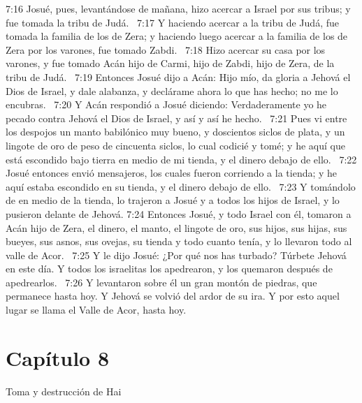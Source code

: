 7:16 Josué, pues, levantándose de mañana, hizo acercar a Israel por sus tribus; y fue tomada la tribu de Judá.  
7:17 Y haciendo acercar a la tribu de Judá, fue tomada la familia de los de Zera; y haciendo luego acercar a la familia de los de Zera por los varones, fue tomado Zabdi.  
7:18 Hizo acercar su casa por los varones, y fue tomado Acán hijo de Carmi, hijo de Zabdi, hijo de Zera, de la tribu de Judá.  
7:19 Entonces Josué dijo a Acán: Hijo mío, da gloria a Jehová el Dios de Israel, y dale alabanza, y declárame ahora lo que has hecho; no me lo encubras.  
7:20 Y Acán respondió a Josué diciendo: Verdaderamente yo he pecado contra Jehová el Dios de Israel, y así y así he hecho.  
7:21 Pues vi entre los despojos un manto babilónico muy bueno, y doscientos siclos de plata, y un lingote de oro de peso de cincuenta siclos, lo cual codicié y tomé; y he aquí que está escondido bajo tierra en medio de mi tienda, y el dinero debajo de ello.  
7:22 Josué entonces envió mensajeros, los cuales fueron corriendo a la tienda; y he aquí estaba escondido en su tienda, y el dinero debajo de ello.  
7:23 Y tomándolo de en medio de la tienda, lo trajeron a Josué y a todos los hijos de Israel, y lo pusieron delante de Jehová. 
7:24 Entonces Josué, y todo Israel con él, tomaron a Acán hijo de Zera, el dinero, el manto, el lingote de oro, sus hijos, sus hijas, sus bueyes, sus asnos, sus ovejas, su tienda y todo cuanto tenía, y lo llevaron todo al valle de Acor.  
7:25 Y le dijo Josué: ¿Por qué nos has turbado? Túrbete Jehová en este día. Y todos los israelitas los apedrearon, y los quemaron después de apedrearlos.  
7:26 Y levantaron sobre él un gran montón de piedras, que permanece hasta hoy. Y Jehová se volvió del ardor de su ira. Y por esto aquel lugar se llama el Valle de Acor, hasta hoy.  
\section*{Capítulo 8}
Toma y destrucción de Hai  

